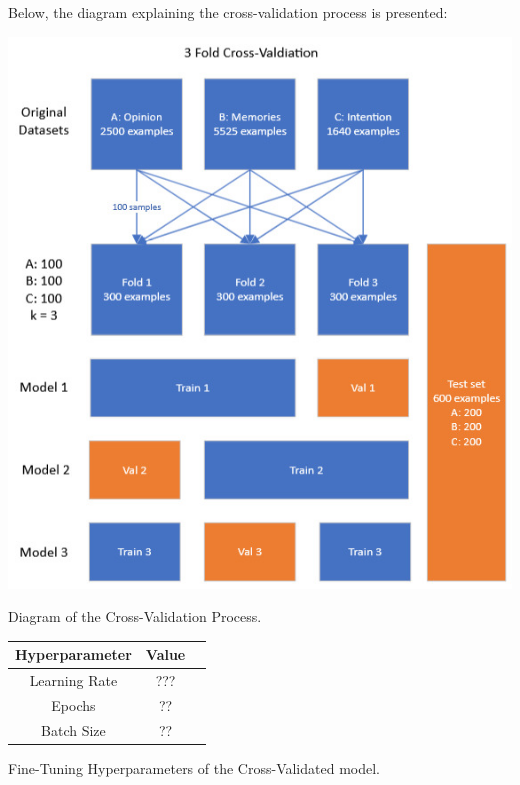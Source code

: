 \documentclass[10pt,twocolumn,letterpaper]{article}
\begin{document}
Below, the diagram explaining the cross-validation process is presented:

\begin{center}
\includegraphics*[scale=0.40]{img/cross_validation_diagram.jpg}
\end{center}

\begin{center}
    \small {Diagram of the Cross-Validation Process.} 
\end{center}

\begin{center}

    \begin{tabular}{ccc}
        \toprule
        Hyperparameter & Value \\
        \midrule
        Learning Rate & ??? \\
        Epochs & ?? \\
        Batch Size & ?? \\
        \bottomrule
    \end{tabular} 
 
\end{center}

\begin{center}
    \small {Fine-Tuning Hyperparameters of the Cross-Validated model.}
\end{center}
\end{document}
